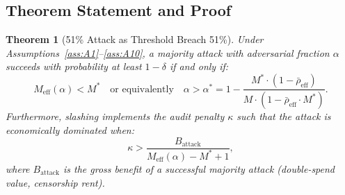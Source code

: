\documentclass[11pt,a4paper]{article}
\newtheorem{theorem}{Theorem}[section]
\theoremstyle{definition}
\newcommand{\mthreshold}{M^{*}}
\newcommand{\PoS}{\mathrm{PoS}}
\begin{document}
\subsection{Theorem Statement and Proof}
\begin{theorem}[51\% Attack as Threshold Breach 51\%]
\label{thm:fiftyone}
Under Assumptions~\ref{ass:A1}--\ref{ass:A10}, a majority attack with adversarial fraction $\alpha$ succeeds with probability at least $1 - \delta$ if and only if:
\begin{equation}
    M_{\mathrm{eff}}(\alpha) < \mthreshold \quad \text{or equivalently} \quad \alpha > \alpha^* = 1 - \frac{\mthreshold \cdot (1 - \bar{\rho}_{\mathrm{eff}})}{M \cdot (1 - \bar{\rho}_{\mathrm{eff}} \cdot \mthreshold)}.
    \label{eq:attack_condition}
\end{equation}
Furthermore, \PoS{} slashing implements the audit penalty $\kappa$ such that the attack is economically dominated when:
\begin{equation}
    \kappa > \frac{B_{\mathrm{attack}}}{M_{\mathrm{eff}}(\alpha) - \mthreshold + 1},
    \label{eq:slashing_bound}
\end{equation}
where $B_{\mathrm{attack}}$ is the gross benefit of a successful majority attack (double-spend value, censorship rent).
\end{theorem}
\end{document}

